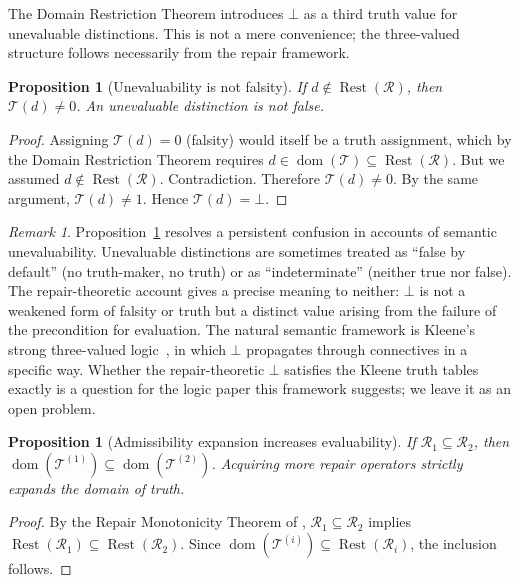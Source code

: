 \documentclass[12pt, oneside]{article}
\theoremstyle{plain}
\newtheorem{proposition}[theorem]{Proposition}
\theoremstyle{definition}
\theoremstyle{remark}
\newtheorem{remark}[theorem]{Remark}
\DeclareMathOperator{\Rest}{Rest}
\newcommand{\Tsub}{\mathcal{T}}
\newcommand{\RestR}{\Rest(\mathcal{R})}
\newcommand{\Undef}{\mathord{\perp}} %
\begin{document}
The Domain Restriction Theorem introduces $\Undef$ as a third
truth value for unevaluable distinctions.
This is not a mere convenience; the three-valued structure follows
necessarily from the repair framework.

\begin{proposition}[Unevaluability is not falsity]
  If $d \notin \RestR$, then $\Tsub(d) \neq 0$.
  An unevaluable distinction is not false.
  \label{prop:bot-not-false}
\end{proposition}

\begin{proof}
  Assigning $\Tsub(d) = 0$ (falsity) would itself be a truth
  assignment, which by the Domain Restriction Theorem requires
  $d \in \operatorname{dom}(\Tsub) \subseteq \RestR$.
  But we assumed $d \notin \RestR$.
  Contradiction.
  Therefore $\Tsub(d) \neq 0$.
  By the same argument, $\Tsub(d) \neq 1$.
  Hence $\Tsub(d) = \Undef$.
\end{proof}

\begin{remark}
  Proposition~\ref{prop:bot-not-false} resolves a persistent
  confusion in accounts of semantic unevaluability.
  Unevaluable distinctions are sometimes treated as ``false by
  default'' (no truth-maker, no truth) or as ``indeterminate''
  (neither true nor false).
  The repair-theoretic account gives a precise meaning to neither:
  $\Undef$ is not a weakened form of falsity or truth but a distinct
  value arising from the failure of the precondition for evaluation.
  The natural semantic framework is Kleene's strong three-valued
  logic~\cite{Kleene1952}, in which $\Undef$ propagates through
  connectives in a specific way.
  Whether the repair-theoretic $\Undef$ satisfies the Kleene truth
  tables exactly is a question for the logic paper this framework
  suggests; we leave it as an open problem.
\end{remark}

\begin{proposition}[Admissibility expansion increases evaluability]
  If $\mathcal{R}_1 \subseteq \mathcal{R}_2$, then
  $\operatorname{dom}(\Tsub^{(1)}) \subseteq
  \operatorname{dom}(\Tsub^{(2)})$.
  Acquiring more repair operators strictly expands the domain
  of truth.
  \label{prop:expansion}
\end{proposition}

\begin{proof}
  By the Repair Monotonicity Theorem of \cite{Flyxion2026a},
  $\mathcal{R}_1 \subseteq \mathcal{R}_2$ implies
  $\Rest(\mathcal{R}_1) \subseteq \Rest(\mathcal{R}_2)$.
  Since $\operatorname{dom}(\Tsub^{(i)}) \subseteq
  \Rest(\mathcal{R}_i)$, the inclusion follows.
\end{proof}
\end{document}

